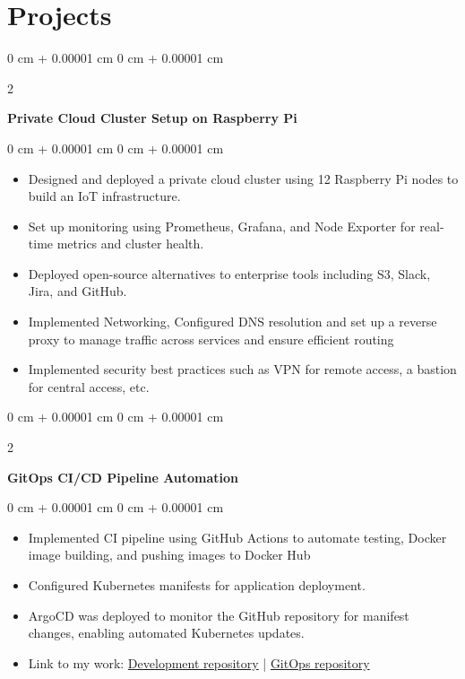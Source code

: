 \documentclass[10pt, letterpaper]{article}
\newenvironment{highlights}{
    \begin{itemize}[
        topsep=0.10 cm,
        parsep=0.10 cm,
        partopsep=0pt,
        itemsep=0pt,
        leftmargin=0 cm + 10pt
    ]
}{
    \end{itemize}
} %
\newenvironment{onecolentry}{
    \begin{adjustwidth}{
        0 cm + 0.00001 cm
    }{
        0 cm + 0.00001 cm
    }
}{
    \end{adjustwidth}
} %
\newenvironment{twocolentry}[2][]{
    \onecolentry
    \def\secondColumn{#2}
    \setcolumnwidth{\fill, 4.5 cm}
    \begin{paracol}{2}
}{
    \switchcolumn \raggedleft \secondColumn
    \end{paracol}
    \endonecolentry
} %
\begin{document}
    \section{Projects}

        \begin{twocolentry}{
        }
            \textbf{Private Cloud Cluster Setup on Raspberry Pi}\end{twocolentry}

        \vspace{0.10 cm}
        \begin{onecolentry}
            \begin{highlights}
                \item Designed and deployed a private cloud cluster using 12 Raspberry Pi nodes to build an IoT infrastructure.
                \item Set up monitoring using Prometheus, Grafana, and Node Exporter for real-time metrics and cluster health.
                \item Deployed open-source alternatives to enterprise tools including S3, Slack, Jira, and GitHub.
                \item Implemented Networking, Configured DNS resolution and set up a reverse proxy to manage traffic across services and ensure efficient routing
                \item Implemented security best practices such as VPN for remote access, a bastion for central access, etc.
            \end{highlights}
        \end{onecolentry}


        \vspace{0.2 cm}

        \begin{twocolentry}{
        }
            \textbf{GitOps CI/CD Pipeline Automation}\end{twocolentry}

        \vspace{0.10 cm}
        \begin{onecolentry}
            \begin{highlights}
                \item Implemented CI pipeline using GitHub Actions to automate testing, Docker image building, and pushing images to Docker Hub
                \item Configured Kubernetes manifests for application deployment.
                \item ArgoCD was deployed to monitor the GitHub repository for manifest changes, enabling automated Kubernetes updates.
                \item Link to my work: \href{https://github.com/Charan-Sharan/CRUD}{Development repository} | \href{https://github.com/Charan-Sharan/gitops}{GitOps repository}
            \end{highlights}
        \end{onecolentry}
\end{document}
